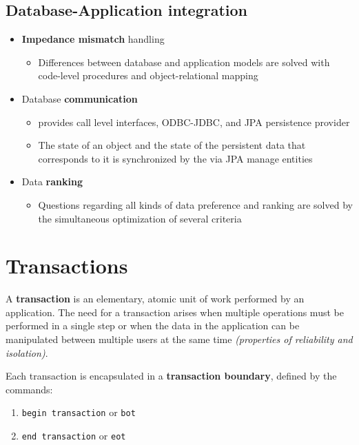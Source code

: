 \documentclass[english]{article}
\begin{document}
\subsection{Database-Application integration}

\begin{itemize}
  \item \textbf{Impedance mismatch} handling
        \begin{itemize}[label=\(\rightarrow\)]
          \item Differences between database and application models are solved with code-level procedures and object-relational mapping
        \end{itemize}
  \item Database \textbf{communication}
        \begin{itemize}[label=\(\rightarrow\)]
          \item \dbms provides call level interfaces, ODBC-JDBC, and JPA persistence provider
          \item The state of an object and the state of the persistent data that corresponds to it is synchronized by the \dbms via JPA manage entities
        \end{itemize}
  \item Data \textbf{ranking}
        \begin{itemize}[label=\(\rightarrow\)]
          \item Questions regarding all kinds of data preference and ranking are solved by the simultaneous optimization of several criteria
        \end{itemize}
\end{itemize}

\clearpage

\section{Transactions}

A \textbf{transaction} is an elementary, atomic unit of work performed by an application.
The need for a transaction arises when multiple operations must be performed in a single step or when the data in the application can be manipulated between multiple users at the same time \textit{(properties of reliability and isolation)}.

Each transaction is encapsulated in a \textbf{transaction boundary}, defined by the commands:

\begin{enumerate}
  \item \texttt{begin transaction} or \texttt{bot}
  \item \texttt{end transaction} or \texttt{eot}
\end{enumerate}
\end{document}

